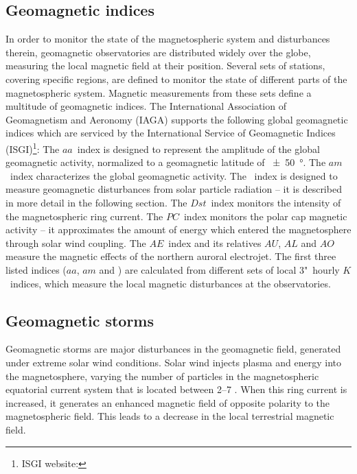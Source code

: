 \subsection{Geomagnetic indices}
\label{sec:geomagnetic_indices}
In order to monitor the state of the magnetospheric system and disturbances therein, geomagnetic observatories are distributed widely over the globe, measuring the local magnetic field at their position. Several sets of stations, covering specific regions, are defined to monitor the state of different parts of the magnetospheric system. Magnetic measurements from these sets define a multitude of geomagnetic indices. The International Association of Geomagnetism and Aeronomy (IAGA) supports the following global geomagnetic indices which are serviced by the International Service of Geomagnetic Indices (ISGI)\footnote{ISGI website: }:
The $aa$~index is designed to represent the amplitude of the global geomagnetic activity, normalized to a geomagnetic latitude of \SI{+-50}{\degree}. The $am$~index characterizes the global geomagnetic activity. The \Kp{}~index is designed to measure geomagnetic disturbances from solar particle radiation -- it is described in more detail in the following section. The $Dst$~index monitors the intensity of the magnetospheric ring current. The $PC$~index monitors the polar cap magnetic activity -- it approximates the amount of energy which entered the magnetosphere through solar wind coupling. The $AE$~index and its relatives $AU$, $AL$ and $AO$ measure the magnetic effects of the northern auroral electrojet.
The first three listed indices ($aa$, $am$ and \Kp{}) are calculated from different sets of local 3"~hourly $K$~indices, which measure the local magnetic disturbances at the observatories.\\


\subsection{Geomagnetic storms}
\label{sec:geomagnetic_storms}
Geomagnetic storms are major disturbances in the geomagnetic field, generated under extreme solar wind conditions. Solar wind injects plasma and energy into the magnetosphere, varying the number of particles in the magnetospheric equatorial current system that is located between \SIrange{2}{7}{\RE} \citep{Gonzalez1994}. When this ring current is increased, it generates an enhanced magnetic field of opposite polarity to the magnetospheric field. This leads to a decrease in the local terrestrial magnetic field.

